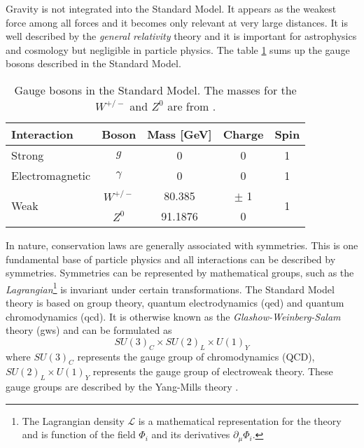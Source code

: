 Gravity is not integrated into the Standard Model. It appears as the weakest force among all forces and it becomes only relevant at very large distances. It is well described by the \textit{general relativity} theory \cite{Einstein:1905ve} and it is important for astrophysics and cosmology but negligible in particle physics. The table \ref{table:GaugeBosons} sums up the gauge bosons described in the Standard Model.

\begin{table}[htb!]
  \centering
  \caption{Gauge bosons in the Standard Model. The masses for the $W^{+/-}$ and $Z^0$ are from \cite{Patrignani:2016xqp}.}
  \label{table:GaugeBosons}
  \begin{tabular}{|p{7cm}||cccc|}
    \hline
    Interaction & Boson & Mass [GeV] & Charge & Spin\\
    \hline
    Strong & $g$ & 0 & 0 & 1\\
    \hline
    Electromagnetic & $\gamma$ & 0 & 0 & 1\\
    \hline
    \multirow{2}{*}{Weak} & $W^{+/-}$ & 80.385 & $\pm$ 1 & \multirow{2}{*}{1}\\
    & $Z^0$ & 91.1876 & 0 &\\
    \hline
  \end{tabular}
\end{table}

In nature, conservation laws are generally associated with symmetries. This is one fundamental base of particle physics and all interactions can be described by symmetries. Symmetries can be represented by mathematical groups, such as the \textit{Lagrangian}\footnote{The Lagrangian density $\mathcal{L}$ is a mathematical representation for the theory and is function of the field $\Phi_i$ and its derivatives $\partial_{\mu}\Phi_i$.} is invariant under certain transformations. The Standard Model theory is based on group theory, quantum electrodynamics (\acrshort{qed}) and quantum chromodynamics (\acrshort{qcd}). It is otherwise known as the \textit{Glashow-Weinberg-Salam} theory (\acrshort{gws}) and can be formulated as
\begin{equation}
  SU(3)_{C} \times SU(2)_{L} \times U(1)_{Y}
\end{equation}
where $SU(3)_{C}$ represents the gauge group of chromodynamics (QCD), $SU(2)_{L} \times U(1)_{Y}$ represents the gauge group of electroweak theory. These gauge groups are described by the Yang-Mills theory \cite{Yang:1954ek}.

